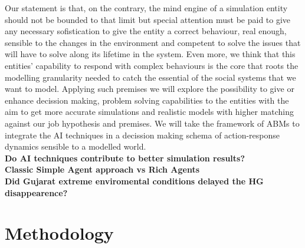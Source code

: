 \documentclass[11pt,oneside,a4paper,openright]{report}
\begin{document}
Our statement is that, on the contrary, the mind engine of a simulation entity should not be bounded to that limit but special attention must be paid to give any necessary sofistication to give the entity a correct behaviour, real enough, sensible to the changes in the environment and competent to solve the issues that will have to solve along its lifetime in the system. Even more, we think that this entities' capability to respond with complex behaviours is the core that roots the modelling granularity needed to catch the essential of the social systems that we want to model.
Applying such premises we will explore the possibility to give or enhance decission making, problem solving
capabilities to the entities with the aim to get more accurate simulations and realistic models with higher matching against our job hypothesis and premises. We will take the framework of ABMs to integrate the AI techniques in a decission making schema of action-response dynamics sensible to a modelled world.\\



\indent \textbf{Do AI techniques contribute to better simulation results?}\\
\indent \textbf{Classic Simple Agent approach vs Rich Agents}\\
\indent \textbf{Did Gujarat extreme enviromental conditions delayed the HG disappearence?}\\
\newpage 




\chapter{Methodology}

\end{document}
